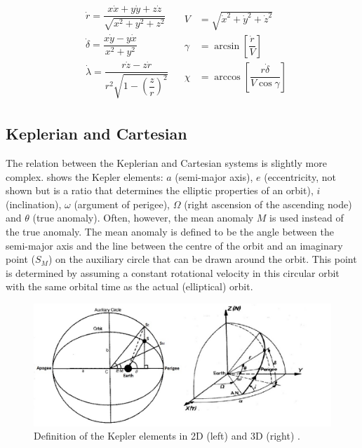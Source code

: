\begin{align} \label{eq:carttospherv}
\begin{split}
& \dot{r}=\dfrac{x\dot{x}+y\dot{y}+z\dot{z}}{\sqrt{x^{2}+y^{2}+z^{2}}}\\
& \dot{\delta}=\dfrac{x\dot{y}-y\dot{x}}{x^{2}+y^{2}}\\
& \dot{\lambda}=\dfrac{r\dot{z}-z\dot{r}}{r^{2}\sqrt{1-\left(\dfrac{z}{r}\right)^{2}}}
\end{split}
&
\begin{split}
V&=\sqrt{\dot{x}^{2}+\dot{y}^{2}+\dot{z}^{2}}\\
\gamma&=\arcsin\left[\dfrac{\dot{r}}{V}\right]\\
\chi&=\arccos\left[\dfrac{r \dot{\delta}}{V\cos\gamma }\right]
\end{split}
\end{align}


\subsection{Keplerian and Cartesian}
\label{subsec:keplcart}
The relation between the Keplerian and Cartesian systems is slightly more complex.  shows the Kepler elements: $a$ (semi-major axis), $e$ (eccentricity, not shown but is a ratio that determines the elliptic properties of an orbit), $i$ (inclination), $\omega$ (argument of perigee), $\Omega$ (right ascension of the ascending node) and $\theta$ (true anomaly). Often, however, the mean anomaly $M$ is used instead of the true anomaly. The mean anomaly is defined to be the angle between the semi-major axis and the line between the centre of the orbit and an imaginary point ($S_{M}$) on the auxiliary circle that can be drawn around the orbit. This point is determined by assuming a constant rotational velocity in this circular orbit with the same orbital time as the actual (elliptical) orbit. 



\begin{figure}[!ht]
\centering
\includegraphics[width=1.0\textwidth]{figures/reference_frames/kepler_noomen2013basic_akcasu2013.jpg}
\caption{Definition of the Kepler elements in 2D (left) and 3D (right) \citep{noomen2013basic,akcasu2013}.}
\label{fig:kepler_noomen2013basic_akcasu2013_1}
\end{figure}

